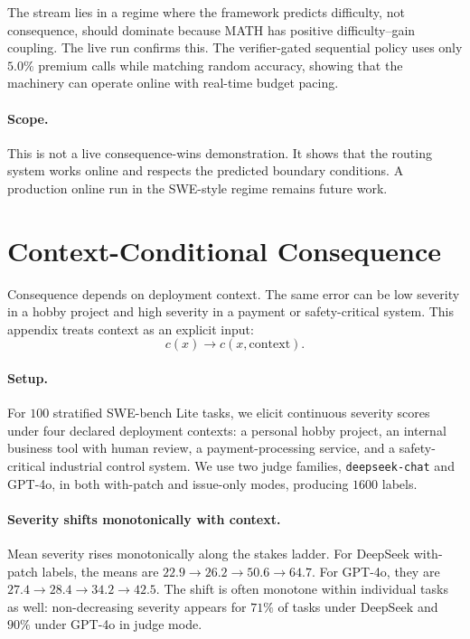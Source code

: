 \documentclass{article}
\begin{document}
The stream lies in a regime where the framework predicts difficulty,
not consequence, should dominate because MATH has positive
difficulty--gain coupling. The live run confirms this. The
verifier-gated sequential policy uses only $5.0\%$ premium calls while
matching random accuracy, showing that the machinery can operate online
with real-time budget pacing.

\paragraph{Scope.}
This is not a live consequence-wins demonstration. It shows that the
routing system works online and respects the predicted boundary
conditions. A production online run in the SWE-style regime remains
future work.

\section{Context-Conditional Consequence}
\label{app:context}

Consequence depends on deployment context. The same error can be low
severity in a hobby project and high severity in a payment or
safety-critical system. This appendix treats context as an explicit
input:
\[
c(x) \rightarrow c(x,\mathrm{context}).
\]

\paragraph{Setup.}
For $100$ stratified SWE-bench Lite tasks, we elicit continuous
severity scores under four declared deployment contexts: a personal
hobby project, an internal business tool with human review, a
payment-processing service, and a safety-critical industrial control
system. We use two judge families, \texttt{deepseek-chat} and GPT-4o,
in both with-patch and issue-only modes, producing $1600$ labels.

\paragraph{Severity shifts monotonically with context.}
Mean severity rises monotonically along the stakes ladder. For
DeepSeek with-patch labels, the means are
$22.9 \to 26.2 \to 50.6 \to 64.7$. For GPT-4o, they are
$27.4 \to 28.4 \to 34.2 \to 42.5$. The shift is often monotone within
individual tasks as well: non-decreasing severity appears for
$71\%$ of tasks under DeepSeek and $90\%$ under GPT-4o in judge mode.
\end{document}
